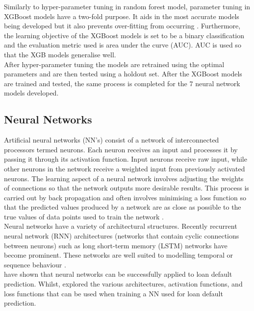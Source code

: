 Similarly to hyper-parameter tuning in random forest model, parameter tuning in XGBoost models have a two-fold purpose. It aids in the most accurate models being developed but it also prevents over-fitting from occurring \parencite{xgb_tuning}. Furthermore, the learning objective of the XGBoost models is set to be a binary classification and the evaluation metric used is area under the curve (AUC). AUC is used so that the XGB models generalise well. \\

After hyper-parameter tuning the models are retrained using the optimal parameters and are then tested using a holdout set. After the XGBoost models are trained and tested, the same process is completed for the 7 neural network models developed.  


\subsection{Neural Networks}

Artificial neural networks (NN's) consist of a network of interconnected processors termed neurons. Each neuron receives an input and processes it by passing it through its activation function. Input neurons receive raw input, while other neurons in the network receive a weighted input from previously activated neurons. The learning aspect of a neural network involves adjusting the weights of connections so that the network outputs more desirable results. This process is carried out by back propagation and often involves minimising a loss function so that the predicted values produced by a network are as close as possible to the true values of data points used to train the network \parencite{NNOverview}. \\ 

Neural networks have a variety of architectural structures. Recently recurrent neural network (RNN) architectures (networks that contain cyclic connections between neurons) such as long short-term memory (LSTM) networks have become prominent. These networks are well suited to modelling temporal or sequence behaviour \parencite{LSTM}. \\

\textcite{DecTreesZekic} have shown that neural networks can be successfully applied to loan default prediction. Whilst, \textcite{NNWest} explored the various architectures, activation functions, and loss functions that can be used when training a NN used for loan default prediction. \\

